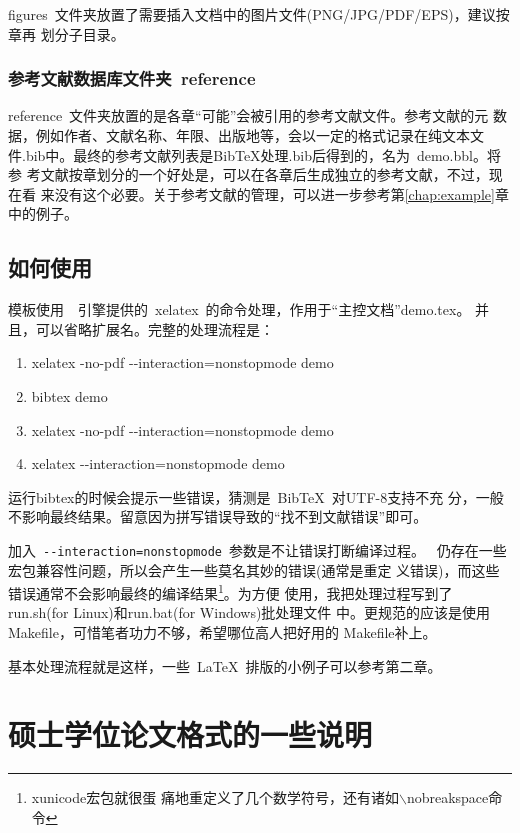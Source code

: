 figures~文件夹放置了需要插入文档中的图片文件(PNG/JPG/PDF/EPS)，建议按章再
划分子目录。

\subsubsection{参考文献数据库文件夹~reference}
\label{sec:bibdir}

reference~文件夹放置的是各章``可能''会被引用的参考文献文件。参考文献的元
数据，例如作者、文献名称、年限、出版地等，会以一定的格式记录在纯文本文
件.bib中。最终的参考文献列表是BibTeX处理.bib后得到的，名为~demo.bbl。将参
考文献按章划分的一个好处是，可以在各章后生成独立的参考文献，不过，现在看
来没有这个必要。关于参考文献的管理，可以进一步参考第\ref{chap:example}章
中的例子。

\subsection{如何使用}
\label{sec:process}

模板使用~\XeTeX~引擎提供的~xelatex~的命令处理，作用于“主控文档”demo.tex。
并且，可以省略扩展名。完整的处理流程是：
\begin{enumerate}
\item[] \inv xelatex -no-pdf -{}-interaction=nonstopmode demo
\item[] \inv bibtex demo 
\item[] \inv xelatex -no-pdf -{}-interaction=nonstopmode demo 
\item[] \inv xelatex -{}-interaction=nonstopmode demo 
\end{enumerate}

运行bibtex的时候会提示一些错误，猜测是~{{\sc Bib}\TeX}~对UTF-8支持不充
分，一般不影响最终结果。留意因为拼写错误导致的``找不到文献错误''即可。

加入~\verb|--interaction=nonstopmode|~参数是不让错误打断编译过程。
\XeTeX~仍存在一些宏包兼容性问题，所以会产生一些莫名其妙的错误(通常是重定
义错误)，而这些错误通常不会影响最终的编译结果\footnote{xunicode宏包就很蛋
  痛地重定义了几个数学符号，还有诸如$\backslash$nobreakspace命令}。为方便
使用，我把处理过程写到了run.sh(for Linux)和run.bat(for Windows)批处理文件
中。更规范的应该是使用Makefile，可惜笔者功力不够，希望哪位高人把好用的
Makefile补上。

基本处理流程就是这样，一些~\LaTeX~排版的小例子可以参考第二章。

\section{硕士学位论文格式的一些说明}
\label{sec:thesisformat}


